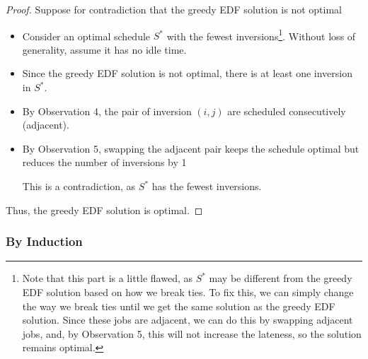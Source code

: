 \begin{proof}
    Suppose for contradiction that the greedy EDF solution is not optimal

    \begin{itemize}
        \item Consider an optimal schedule $S^*$ with the fewest inversions\footnote{Note that this part is a little flawed, as $S^*$ may be different from the greedy EDF solution based on how we break ties. To fix this, we can simply change the way we break ties until we get the same solution as the greedy EDF solution. Since these jobs are adjacent, we can do this by swapping adjacent jobs, and, by Observation 5, this will not increase the lateness, so the solution remains optimal.}. Without loss of generality, assume it has no idle time.

        \item Since the greedy EDF solution is not optimal, there is at least one inversion in $S^*$.

        \item By Observation 4, the pair of inversion $(i, j)$ are scheduled consecutively (adjacent).

        \item By Observation 5, swapping the adjacent pair keeps the schedule optimal but reduces the number of inversions by 1

        This is a contradiction, as $S^*$ has the fewest inversions.
    \end{itemize}

    Thus, the greedy EDF solution is optimal.
\end{proof}

\subsubsection{By Induction}

